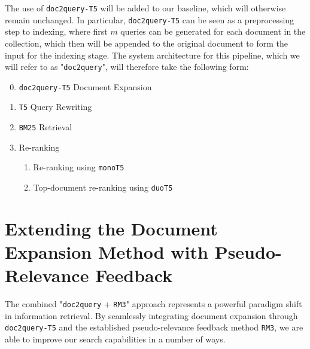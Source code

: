 \documentclass[sigconf]{acmart}
\begin{document}
The use of \texttt{doc2query-T5} will be added to our baseline, which will otherwise remain unchanged. In particular, \texttt{doc2query-T5} can be seen as a preprocessing step to indexing, where first $m$ queries can be generated for each document in the collection, which then will be appended to the original document to form the input for the indexing stage. The system architecture for this pipeline, which we will refer to as "\texttt{doc2query}", will therefore take the following form:
\begin{enumerate}
	\setcounter{enumi}{-1}
	\item	\texttt{doc2query-T5} Document Expansion
	\item	\texttt{T5} Query Rewriting
	\item	\texttt{BM25} Retrieval
	\item	Re-ranking
			\begin{enumerate}
				\item	Re-ranking using \texttt{monoT5}
				\item	Top-document re-ranking using \texttt{duoT5}
			\end{enumerate}
\end{enumerate}

\section{Extending the Document Expansion Method with Pseudo-Relevance Feedback}\label{sec:doc2query-method+rm3}
The combined "\texttt{doc2query} + \texttt{RM3}" approach represents a powerful paradigm shift in information retrieval. By seamlessly integrating document expansion through \texttt{doc2query-T5} and the established pseudo-relevance feedback method \texttt{RM3}, we are able to improve our search capabilities in a number of ways.
\end{document}
